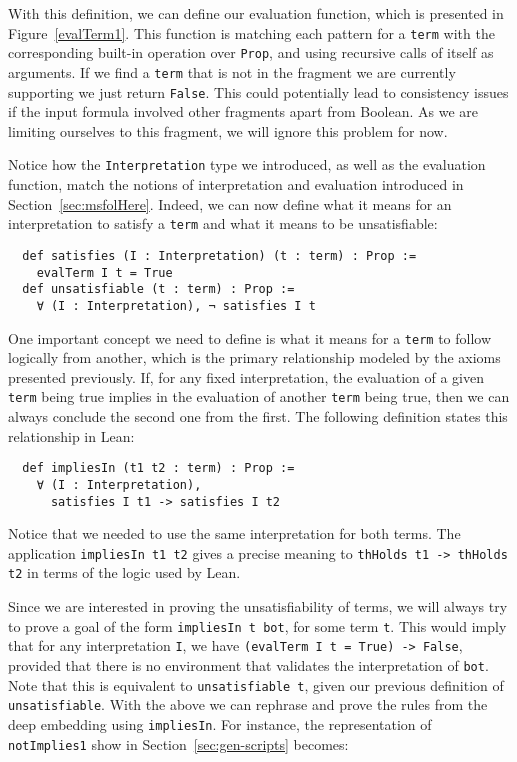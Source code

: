 With this definition, we can define our evaluation function, which is presented in
Figure~\ref{evalTerm1}.
This function is matching each pattern for a \texttt{term} with the corresponding built-in operation over \texttt{Prop}, and using recursive calls of itself as arguments. If we find a \texttt{term} that is not in the fragment we are currently supporting we just return \texttt{False}. This could potentially lead to consistency issues if the input formula involved other fragments apart from Boolean. As we are limiting ourselves to this fragment, we will ignore this problem for now.

Notice how the \texttt{Interpretation} type we introduced, as well as the evaluation function, match the notions of interpretation and evaluation introduced in Section~\ref{sec:msfolHere}. Indeed, we can now define what it means for an interpretation to satisfy a \texttt{term} and what it means to be unsatisfiable:

\begin{verbatim}
  def satisfies (I : Interpretation) (t : term) : Prop :=
    evalTerm I t = True
  def unsatisfiable (t : term) : Prop :=
    ∀ (I : Interpretation), ¬ satisfies I t
\end{verbatim}

One important concept we need to define is what it means for a \texttt{term}
to follow logically from another, which is the primary relationship modeled
by the axioms presented previously.
%
If, for any fixed interpretation, the evaluation of a given \texttt{term} being true
implies in the evaluation of another \texttt{term} being true, then we can always
conclude the second one from the first. The following definition states this
relationship in Lean:

\begin{verbatim}
  def impliesIn (t1 t2 : term) : Prop :=
    ∀ (I : Interpretation),
      satisfies I t1 -> satisfies I t2
\end{verbatim}

Notice that we needed to use the same interpretation for both terms.
%
The application \texttt{impliesIn t1 t2} gives a precise meaning to \texttt{thHolds t1 -> thHolds t2} in terms of the logic used by Lean.

Since we are interested in proving the unsatisfiability of terms, we will always try to prove a goal of the form \texttt{impliesIn t bot}, for some term \texttt{t}. This would imply that for any interpretation \texttt{I}, we have \texttt{(evalTerm I t = True) -> False}, provided that there is no environment that validates the interpretation of \texttt{bot}. Note that this is equivalent to \texttt{unsatisfiable t}, given our previous definition of \texttt{unsatisfiable}.
With the above we can rephrase and prove the rules from the deep embedding using
\texttt{impliesIn}.
%
For instance, the representation of \texttt{notImplies1} show in Section~\ref{sec:gen-scripts} becomes:

